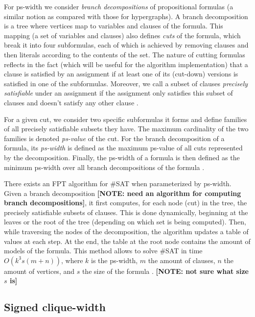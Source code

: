 \documentclass{article}
\begin{document}
For ps-width we consider {\em branch decompositions} of propositional formulas (a similar notion as compared with those for hypergraphs).
A branch decomposition is a tree where vertices map to variables and clauses of the formula.
This mapping (a set of variables and clauses) also defines {\em cuts} of the formula, which break it into four subformulas, each of which is achieved by removing clauses and then literals according to the contents of the set.
The nature of cutting formulas reflects in the fact (which will be useful for the algorithm implementation) that a clause is satisfied by an assignment if at least one of its (cut-down) versions is satisfied in one of the subformulas.
Moreover, we call a subset of clauses {\em precisely satisfiable} under an assignment if the assignment only satisfies this subset of clauses and doesn't satisfy any other clause \cite{DBLP:conf/sat/SaetherTV14}.

For a given cut, we consider two specific subformulas it forms and define families of all precisely satisfiable subsets they have.
The maximum cardinality of the two families is denoted {\em ps-value} of the cut.
For the branch decomposition of a formula, its {\em ps-width} is defined as the maximum ps-value of all cuts represented by the decomposition.
Finally, the ps-width of a formula is then defined as the minimum ps-width over all branch decompositions of the formula \cite{DBLP:conf/sat/SaetherTV14}.

There exists an FPT algorithm for \#SAT when parameterized by ps-width.
Given a branch decomposition \textbf{[NOTE: need an algorithm for computing branch decompositions]}, it first computes, for each node (cut) in the tree, the precisely satisfiable subsets of clauses.
This is done dynamically, beginning at the leaves or the root of the tree (depending on which set is being computed).
Then, while traversing the nodes of the decomposition, the algorithm updates a table of values at each step.
At the end, the table at the root node contains the amount of models of the formula.
This method allows to solve \#SAT in time $O(k^3 s(m+n))$, where $k$ is the ps-width, $m$ the amount of clauses, $n$ the amount of vertices, and $s$ the size of the formula \cite{DBLP:conf/sat/SaetherTV14}.
\textbf{[NOTE: not sure what size $s$ is]} 

\subsection{Signed clique-width}
\end{document}
